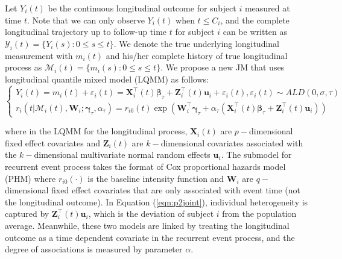 Let $Y_{i}(t)$ be the continuous longitudinal outcome for subject $i$ measured at time $t$. Note that we can only observe $Y_{i}(t)$ when $t\le C_i$, and the complete longitudinal trajectory up to follow-up time $t$ for subject $i$ can be written as $\mathcal{Y}_{i}(t)=\{Y_{i}(s): 0\le s\le t\}$. We denote the true underlying longitudinal measurement with $m_{i}(t)$ and his/her complete history of true longitudinal process as $\mathcal{M}_{i}(t)=\{m_{i}(s): 0\le s \le t\}$. We propose a new JM that uses longitudinal quantile mixed model (LQMM) as follows:
\begin{equation}\label{eqn:p2joint}
\left\{
\begin{array}{l}
Y_{i}(t) = m_{i}(t) + \varepsilon_{i}(t) = {\boldsymbol X}_{i}^{\top}(t)\boldsymbol{\beta}_{\tau} + {\boldsymbol Z}_{i}^{\top}(t){\boldsymbol u}_i + \varepsilon_{i}(t), \varepsilon_{i}(t)\sim ALD(0, \sigma, \tau)\\
r_i(t|\mathcal{M}_{i}(t), {\boldsymbol W}_i;  \boldsymbol{\gamma}_{\tau}, \alpha_{\tau}) = r_{i0}(t)\exp({\boldsymbol W}_i^{\top}\boldsymbol{\gamma}_{\tau} + \alpha_{\tau}({\boldsymbol X}^{\top}_{i}(t)\boldsymbol{\beta}_{\tau} + {\boldsymbol Z}^{\top}_{i}(t){\boldsymbol u}_{i}))
\end{array}
\right.
\end{equation}

\noindent where in the LQMM for the longitudinal process, $\boldsymbol{X}_{i}(t)$ are $p-$dimensional fixed effect covariates and $\boldsymbol{Z}_{i}(t)$ are $k-$dimensional covariates associated with the $k-$dimensional multivariate normal random effects $\boldsymbol{u}_i$. The submodel for recurrent event process takes the format of Cox proportional hazards model (PHM) where $r_{i0}(\cdot)$ is the baseline intensity function and $\boldsymbol{W}_{i}$ are $q-$dimensional fixed effect covariates that are only associated with event time (not the longitudinal outcome). In Equation (\ref{eqn:p2joint}), individual heterogeneity is captured by ${\boldsymbol Z}_{i}^{\top}(t){\boldsymbol u}_i$, which is the deviation of subject $i$ from the population average. Meanwhile, these two models are linked by treating the longitudinal outcome as a time dependent covariate in the recurrent event process, and the degree of associations is measured by parameter $\alpha$.

